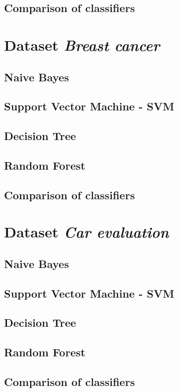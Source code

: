 \documentclass[11pt,a4paper,titlepage]{article}
\begin{document}
\subsection{Comparison of classifiers}

\section{Dataset \textit{Breast cancer}}
\subsection{Naive Bayes}
\subsection{Support Vector Machine - SVM}
\subsection{Decision Tree}
\subsection{Random Forest}
\subsection{Comparison of classifiers}

\section{Dataset \textit{Car evaluation}}
\subsection{Naive Bayes}
\subsection{Support Vector Machine - SVM}
\subsection{Decision Tree}
\subsection{Random Forest}
\subsection{Comparison of classifiers}
\end{document}
